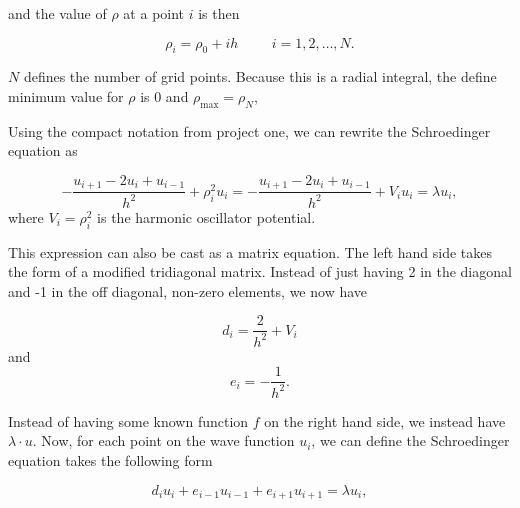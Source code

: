 \documentclass[%
oneside,                 %
final,                   %
10pt]{article}
\begin{document}
and the value of $\rho$ at a point $i$ is then 

\[
    \rho_i= \rho_0 + ih \hspace{1cm} i=1,2,\dots , N.
\]

$N$ defines the number of grid points. Because this is a radial integral, the define minimum value for $\rho$ is 0 and  $\rho_{\mathrm{max}}=\rho_N$,

Using the compact notation from project one, we can rewrite the Schroedinger equation as

\[
-\frac{u_{i+1} -2u_i +u_{i-1}}{h^2}+\rho_i^2u_i=-\frac{u_{i+1} -2u_i +u_{i-1} }{h^2}+V_iu_i  = \lambda u_i,
\]
where $V_i=\rho_i^2$ is the harmonic oscillator potential.

This expression can also be cast as a matrix equation.  The left hand side takes the form of a modified tridiagonal matrix.  Instead of just having 2 in the diagonal and -1 in the off diagonal, non-zero elements, we now have 

\begin{equation*}
   d_i=\frac{2}{h^2}+V_i
\end{equation*}
and 
\begin{equation*}
   e_i=-\frac{1}{h^2}.
\end{equation*}

Instead of having some known function $f$ on the right hand side, we instead have $\lambda \cdot u$.  Now, for each point on the wave function $u_i$, we can define the Schroedinger equation takes the following form

\begin{equation*}
d_iu_i+e_{i-1}u_{i-1}+e_{i+1}u_{i+1}  = \lambda u_i,
\end{equation*}
\end{document}
